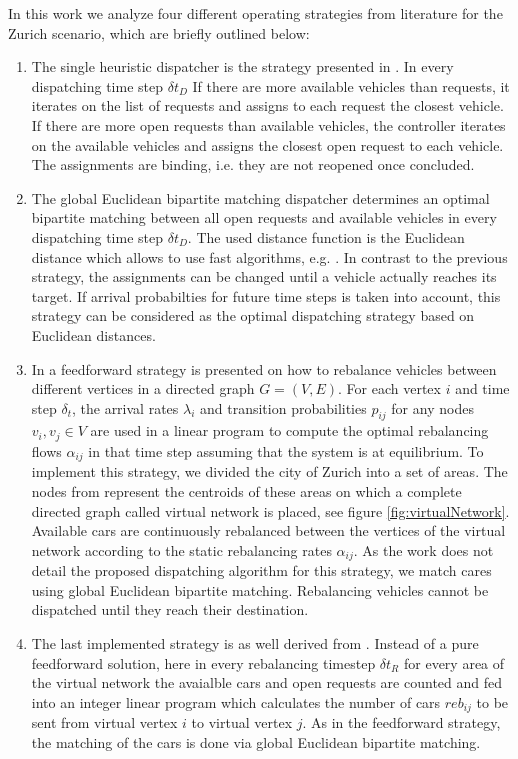 In this work we analyze four different operating strategies from literature for the Zurich scenario, which are briefly outlined below:

\begin{enumerate}
\item The single heuristic dispatcher is the strategy presented in \cite{bischoff2016simulation}. In every dispatching time step $\delta t_D$ If there are more available vehicles than requests, it iterates on the list of requests and assigns to each request the closest vehicle. If there are more open requests than available vehicles, the controller iterates on the available vehicles and assigns the closest open request to each vehicle. The assignments are binding, i.e. they are not reopened once concluded.
\item The global Euclidean bipartite matching dispatcher determines an optimal bipartite matching between all open requests and available vehicles in every dispatching time step $\delta t_D$. The used distance function is the Euclidean distance which allows to use fast algorithms, e.g. \cite{agarwal2004near}. In contrast to the previous strategy, the assignments can be changed until a vehicle actually reaches its target. If arrival probabilties for future time steps is taken into account, this strategy can be considered as the optimal dispatching strategy based on Euclidean distances.
\item In \cite{pavone2011load} a feedforward strategy is presented on how to rebalance vehicles between different vertices in a directed graph $G = (V,E)$. For each vertex $i$ and time step $\delta_t$, the arrival rates $\lambda_i$ and transition probabilities $p_{ij}$ for any nodes $v_i, v_j \in V$  are used in a linear program to compute the optimal rebalancing flows $\alpha _{ij}$ in that time step assuming that the system is at equilibrium. To implement this strategy, we divided the city of Zurich into a set of areas. The nodes from \cite{pavone2011load} represent the centroids of these areas on which a complete directed graph called virtual network is placed, see figure \ref{fig:virtualNetwork}. Available cars are continuously rebalanced between the vertices of the virtual network according to the static rebalancing rates $\alpha_{ij}$. As the work does not detail the proposed dispatching algorithm for this strategy, we match cares using global Euclidean bipartite matching. Rebalancing vehicles cannot be dispatched until they reach their destination.
\item The last implemented strategy is as well derived from \cite{pavone2011load}. Instead of a pure feedforward solution, here in every rebalancing timestep $\delta t_R$ for every area of the virtual network the avaialble cars and open requests are counted and fed into an integer linear program which calculates the number of cars $reb _{ij}$ to be sent from virtual vertex $i$ to virtual vertex $j$. As in the feedforward strategy, the matching of the cars is done via global Euclidean bipartite matching.
\end{enumerate}



